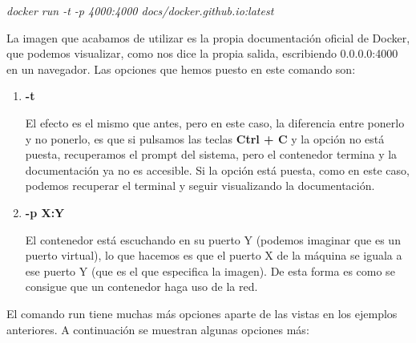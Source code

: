 \documentclass[]{article}
\begin{document}
\begin{center}

	\it docker run -t -p 4000:4000 docs/docker.github.io:latest

\end{center}
La imagen que acabamos de utilizar es la propia documentación oficial de Docker, que podemos visualizar, como nos dice la propia salida, escribiendo 0.0.0.0:4000 en un navegador.
Las opciones que hemos puesto en este comando son:
\begin{enumerate}
\renewcommand{\labelenumi}{$ \bullet $}
	
\item {\bf -t}

 El efecto es el mismo que antes, pero en este caso, la diferencia entre ponerlo y no ponerlo, es que si pulsamos las teclas {\bf Ctrl + C} y la opción no está puesta, recuperamos el prompt del sistema, pero el contenedor termina y la documentación ya no es accesible. Si la opción está puesta, como en este caso, podemos recuperar el terminal y seguir visualizando la documentación.

\item {\bf -p X:Y} 

El contenedor está escuchando en su puerto Y (podemos imaginar que es un puerto virtual), lo que hacemos es que el puerto X de la máquina se iguala a ese puerto Y (que es el que especifica la imagen). De esta forma es como se consigue que un contenedor haga uso de la red.

\end{enumerate}

El comando run tiene muchas más opciones aparte de las vistas en los ejemplos anteriores.
A continuación se muestran algunas opciones más:
\end{document}
